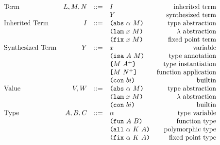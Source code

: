 \documentclass[../main.tex]{subfiles}
\begin{document}
\begin{figure*}[t]
    \centering
    \[\begin{array}{lrclr}
        \textrm{Term}             & L,M,N  & ::= & I                          & \textrm{inherited term}\\
                                  &        &     & Y                          & \textrm{synthesized term}\\
        \textrm{Inherited Term}   & I      & ::= & \texttt{(} \texttt{abs} ~ \alpha ~ M \texttt{)}            & \textrm{type abstraction}\\
                                  &        &     & \texttt{(} \texttt{lam} ~ x ~ M \texttt{)}                 & \textrm{$\lambda$ abstraction}\\
                                  &        &     & \texttt{(} \texttt{fix} ~ x ~ M \texttt{)}                 & \textrm{fixed point term}\\
        \textrm{Synthesized Term} & Y      & ::= & x                          & \textrm{variable}\\
                                  &        &     & \texttt{(} \texttt{isa} ~ A ~ M \texttt{)}                 & \textrm{type annotation}\\
                                  &        &     & \texttt{\{}M ~ A^+\texttt{\}}              & \textrm{type instantiation}\\
                                  &        &     & \texttt{[} M ~ N^+ \texttt{]}               & \textrm{function application}\\
                                  &        &     & \texttt{(} \texttt{con} ~ bi \texttt{)}                   & \textrm{builtin}\\
        \textrm{Value}            & V,W    & ::= & \texttt{(} \texttt{abs} ~ \alpha ~ M \texttt{)}            & \textrm{type abstraction}\\
                                  &        &     & \texttt{(} \texttt{lam} ~ x ~ M \texttt{)}                 & \textrm{$\lambda$ abstraction}\\
                                  &        &     & \texttt{(} \texttt{con} ~ bi \texttt{)}                   & \textrm{builtin}\\
        \textrm{Type}             & A,B,C  & ::= & \alpha                     & \textrm{type variable}\\
                                  &        &     & \texttt{(} \texttt{fun} ~ A ~ B \texttt{)}                & \textrm{function type}\\
                                  &        &     & \texttt{(} \texttt{all} ~ \alpha ~ K ~ A \texttt{)}        & \textrm{polymorphic type}\\
                                  &        &     & \texttt{(} \texttt{fix} ~ \alpha ~ K ~ A \texttt{)}        & \textrm{fixed point type}\\

\end{array}\]
\end{figure*}
\end{document}
